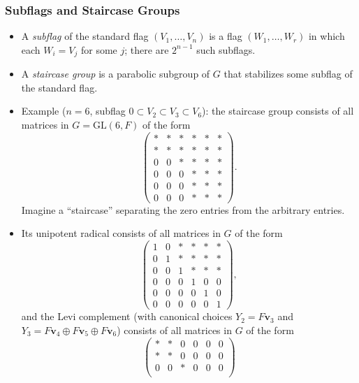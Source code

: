 \documentclass[../Odyssey_Project.tex]{subfiles}
\begin{document}
\subsubsection*{Subflags and Staircase Groups}
\begin{itemize}
    \item A \emph{subflag} of the standard flag $(V_1, \dots, V_n)$ is a flag $(W_1, \dots, W_r)$ in which each $W_i = V_j$ for some $j$; there are $2^{n-1}$ such subflags.
    \item A \emph{staircase group} is a parabolic subgroup of $G$ that stabilizes some subflag of the standard flag.
    \item Example ($n = 6$, subflag $0 \subset V_2 \subset V_3 \subset V_6$): the staircase group consists of all matrices in $G = \mathrm{GL}(6, F)$ of the form
    \[
        \begin{pmatrix}
            * & * & * & * & * & * \\
            * & * & * & * & * & * \\
            0 & 0 & * & * & * & * \\
            0 & 0 & 0 & * & * & * \\
            0 & 0 & 0 & * & * & * \\
            0 & 0 & 0 & * & * & *
        \end{pmatrix}.
    \]
    Imagine a ``staircase'' separating the zero entries from the arbitrary entries.
    \item Its unipotent radical consists of all matrices in $G$ of the form
    \[
        \begin{pmatrix}
            1 & 0 & * & * & * & * \\
            0 & 1 & * & * & * & * \\
            0 & 0 & 1 & * & * & * \\
            0 & 0 & 0 & 1 & 0 & 0 \\
            0 & 0 & 0 & 0 & 1 & 0 \\
            0 & 0 & 0 & 0 & 0 & 1
        \end{pmatrix},
    \]
    and the Levi complement (with canonical choices $Y_2 = F\mathbf{v}_3$ and $Y_3 = F\mathbf{v}_4 \oplus F\mathbf{v}_5 \oplus F\mathbf{v}_6$) consists of all matrices in $G$ of the form
    \[
        \begin{pmatrix}
            * & * & 0 & 0 & 0 & 0 \\
            * & * & 0 & 0 & 0 & 0 \\
            0 & 0 & * & 0 & 0 & 0 \\

\end{pmatrix}\]
\end{itemize}
\end{document}
